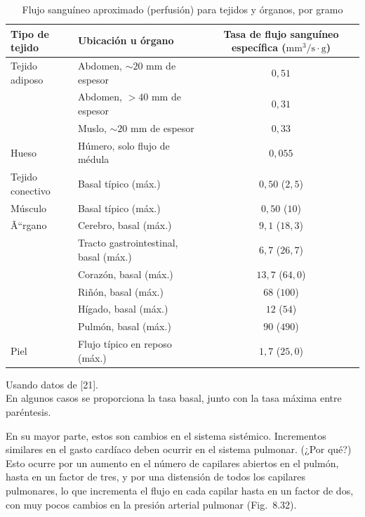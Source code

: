 \documentclass[12pt]{book}
\begin{document}
\begin{table}[htbp]
\centering
\caption{Flujo sanguíneo aproximado (perfusión) para tejidos y órganos, por gramo}
\label{tab:87}
\small
\begin{tabularx}{\textwidth}{l X c}
\toprule
\textbf{Tipo de tejido} & \textbf{Ubicación u órgano} & \textbf{Tasa de flujo sanguíneo específica ($\text{mm}^3\text{/s}\cdot\text{g}$)} \\
\midrule
Tejido adiposo & Abdomen, ${\sim}20\text{ mm}$ de espesor & $0{,}51$ \\
 & Abdomen, $>40\text{ mm}$ de espesor & $0{,}31$ \\
 & Muslo, ${\sim}20\text{ mm}$ de espesor & $0{,}33$ \\
Hueso & Húmero, solo flujo de médula & $0{,}055$ \\
Tejido conectivo & Basal típico (máx.) & $0{,}50$ ($2{,}5$) \\
Músculo & Basal típico (máx.) & $0{,}50$ ($10$) \\
Ã``rgano & Cerebro, basal (máx.) & $9{,}1$ ($18{,}3$) \\
 & Tracto gastrointestinal, basal (máx.) & $6{,}7$ ($26{,}7$) \\
 & Corazón, basal (máx.) & $13{,}7$ ($64{,}0$) \\
 & Riñón, basal (máx.) & $68$ ($100$) \\
 & Hígado, basal (máx.) & $12$ ($54$) \\
 & Pulmón, basal (máx.) & $90$ ($490$) \\
Piel & Flujo típico en reposo (máx.) & $1{,}7$ ($25{,}0$) \\
\bottomrule
\end{tabularx}
\begin{flushleft}
    \small Usando datos de [21].\\
    En algunos casos se proporciona la tasa basal, junto con la tasa máxima entre paréntesis.
\end{flushleft}
\end{table}

En su mayor parte, estos son cambios en el sistema sistémico. Incrementos similares en el gasto cardíaco deben ocurrir en el sistema pulmonar. (¿Por qué?) Esto ocurre por un aumento en el número de capilares abiertos en el pulmón, hasta en un factor de tres, y por una distensión de todos los capilares pulmonares, lo que incrementa el flujo en cada capilar hasta en un factor de dos, con muy pocos cambios en la presión arterial pulmonar (Fig.~8.32).
\end{document}
